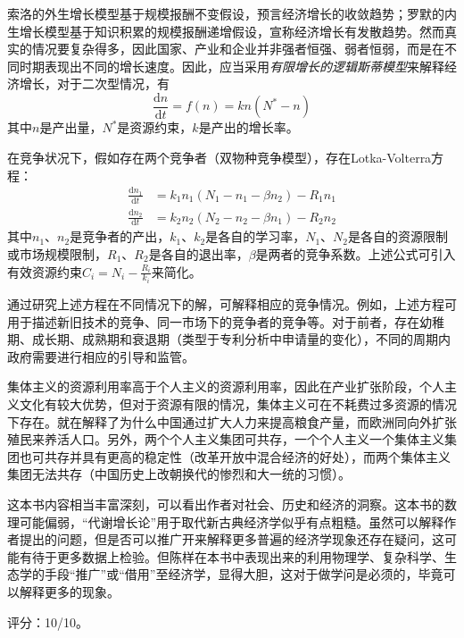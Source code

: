 索洛的外生增长模型基于规模报酬不变假设，预言经济增长的收敛趋势；罗默的内生增长模型基于知识积累的规模报酬递增假设，宣称经济增长有发散趋势。然而真实的情况要复杂得多，因此国家、产业和企业并非强者恒强、弱者恒弱，而是在不同时期表现出不同的增长速度。因此，应当采用\emph{有限增长的逻辑斯蒂模型}来解释经济增长，对于二次型情况，有
\begin{equation}
\frac{\mathrm{d}n}{\mathrm{d}t} = f(n) = kn(N^{*}-n)
\end{equation}
其中$n$是产出量，$N^{*}$是资源约束，$k$是产出的增长率。

在竞争状况下，假如存在两个竞争者（双物种竞争模型），存在Lotka-Volterra方程：
\begin{align}
\frac{\mathrm{d}n_1}{\mathrm{d}t} & = k_1 n_1 (N_1 -n_1-\beta n_2)-R_1 n_1 \\
\frac{\mathrm{d}n_2}{\mathrm{d}t} & = k_2 n_2 (N_2 -n_2 -\beta n_1)-R_2 n_2
\end{align}
其中$n_1$、$n_2$是竞争者的产出，$k_1$、$k_2$是各自的学习率，$N_1$、$N_2$是各自的资源限制或市场规模限制，$R_1$、$R_2$是各自的退出率，$\beta$是两者的竞争系数。上述公式可引入有效资源约束$C_i = N_i - \frac{R_i}{k_i}$来简化。

通过研究上述方程在不同情况下的解，可解释相应的竞争情况。例如，上述方程可用于描述新旧技术的竞争、同一市场下的竞争者的竞争等。对于前者，存在幼稚期、成长期、成熟期和衰退期（类型于专利分析中申请量的变化），不同的周期内政府需要进行相应的引导和监管。

集体主义的资源利用率高于个人主义的资源利用率，因此在产业扩张阶段，个人主义文化有较大优势，但对于资源有限的情况，集体主义可在不耗费过多资源的情况下存在。就在解释了为什么中国通过扩大人力来提高粮食产量，而欧洲同向外扩张殖民来养活人口。另外，两个个人主义集团可共存，一个个人主义一个集体主义集团也可共存并具有更高的稳定性（改革开放中混合经济的好处），而两个集体主义集团无法共存（中国历史上改朝换代的惨烈和大一统的习惯）。

这本书内容相当丰富深刻，可以看出作者对社会、历史和经济的洞察。这本书的数理可能偏弱，“代谢增长论”用于取代新古典经济学似乎有点粗糙。虽然可以解释作者提出的问题，但是否可以推广开来解释更多普遍的经济学现象还存在疑问，这可能有待于更多数据上检验。但陈样在本书中表现出来的利用物理学、复杂科学、生态学的手段“推广”或“借用”至经济学，显得大胆，这对于做学问是必须的，毕竟可以解释更多的现象。

评分：10/10。
